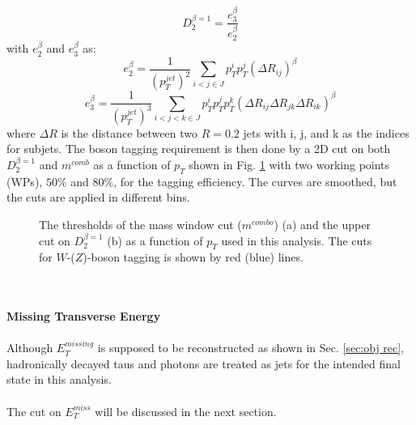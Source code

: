 \begin{equation}
D^{\beta =1}_{2} = \frac{e^{\beta}_{3}}{e^{\beta}_2} 
\end{equation}
with $e^{\beta}_{2}$ and $e^{\beta}_{3}$ as:
\begin{equation}
e^{\beta}_{2} = \frac{1}{(p_{T}^{jet})^2}\displaystyle\sum\limits_{i<j\in J}p_{T}^{i}p_{T}^j(\Delta R_{ij})^{\beta}
\end{equation}
\begin{equation}
e^{\beta}_{3} = \frac{1}{(p_{T}^{jet})^3}\displaystyle\sum\limits_{i<j<k\in J}p_{T}^{i}p_{T}^{j}p_{T}^{k}(\Delta R_{ij}\Delta R_{jk}\Delta R_{ik})^{\beta}
\end{equation}
where $\Delta R$ is the distance between two $R=0.2$ jets with i, j, and k as the indices for subjets. The boson tagging requirement is then done by a 2D cut on both $D^{\beta =1}_{2}$ and $m^{comb}$ as a function of $p_{T}$ shown in Fig. \ref{Fig:newWZtaggerWP} with two working points (WPs), $50\%$ and $80\%$, for the tagging efficiency. The curves are smoothed, but the cuts are applied in different bins.
\begin{figure}[ht]
	\begin{center}
		\caption{The thresholds of the mass window cut ($m^{combo}$) (a) and the upper cut on $D^{\beta =1}_2$ (b) as a function of $p_{T}$ used in this analysis. The cuts  for $W$-($Z$)-boson tagging is shown by red (blue) lines.}
		\label{Fig:newWZtaggerWP}
	\end{center}
\end{figure}
\noindent
\\
\\{\bf Missing Transverse Energy}
\\
\\Although $E^{missing}_{T}$ is supposed to be reconstructed as shown in Sec. \ref{sec:obj rec}, hadronically decayed taus and photons are treated as jets for the intended final state in this analysis.
\\
\\The cut on $E^{miss}_{T}$ will be discussed in the next section.   
